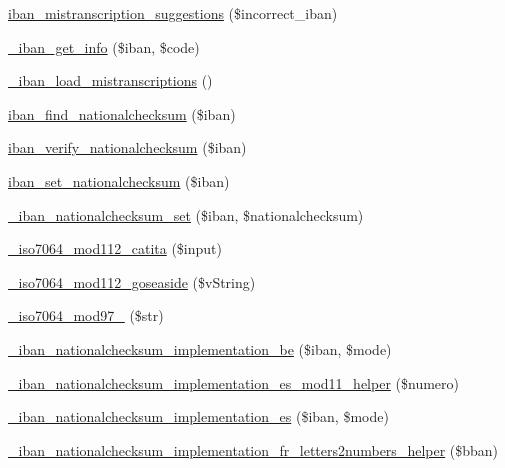 \begin{DoxyCompactItemize}
\hyperlink{classWEPPO_1_1Helpers_1_1IBAN_a33587feb2d62c92fd60b104f3cde0bf9}{iban\+\_\+mistranscription\+\_\+suggestions} (\$incorrect\+\_\+iban)
\item 
\hyperlink{classWEPPO_1_1Helpers_1_1IBAN_addfd1028a5c8f723736bda858edf1b18}{\+\_\+iban\+\_\+get\+\_\+info} (\$iban, \$code)
\item 
\hyperlink{classWEPPO_1_1Helpers_1_1IBAN_abe65378f5932759d6d2d5eddd26e74f0}{\+\_\+iban\+\_\+load\+\_\+mistranscriptions} ()
\item 
\hyperlink{classWEPPO_1_1Helpers_1_1IBAN_a70a116b3763dbd94ea5550ce29e3f72b}{iban\+\_\+find\+\_\+nationalchecksum} (\$iban)
\item 
\hyperlink{classWEPPO_1_1Helpers_1_1IBAN_a55821d4db676112b84dcd5fb16b720f6}{iban\+\_\+verify\+\_\+nationalchecksum} (\$iban)
\item 
\hyperlink{classWEPPO_1_1Helpers_1_1IBAN_a006036ab16fb249833e3e83e0b02d302}{iban\+\_\+set\+\_\+nationalchecksum} (\$iban)
\item 
\hyperlink{classWEPPO_1_1Helpers_1_1IBAN_a7fb2e25d92d76f726ceb39d9dc155692}{\+\_\+iban\+\_\+nationalchecksum\+\_\+set} (\$iban, \$nationalchecksum)
\item 
\hyperlink{classWEPPO_1_1Helpers_1_1IBAN_a36298bcee6bd881050893c4001e67680}{\+\_\+iso7064\+\_\+mod112\+\_\+catita} (\$input)
\item 
\hyperlink{classWEPPO_1_1Helpers_1_1IBAN_ac2019ecd8205765bc592682479a1455e}{\+\_\+iso7064\+\_\+mod112\+\_\+goseaside} (\$v\+String)
\item 
\hyperlink{classWEPPO_1_1Helpers_1_1IBAN_aa348d3fb233092c9f37167e6bfdcc8a7}{\+\_\+iso7064\+\_\+mod97\+\_} (\$str)
\item 
\hyperlink{classWEPPO_1_1Helpers_1_1IBAN_a372144baec6b92d78464f7f829ec3f2a}{\+\_\+iban\+\_\+nationalchecksum\+\_\+implementation\+\_\+be} (\$iban, \$mode)
\item 
\hyperlink{classWEPPO_1_1Helpers_1_1IBAN_ad1f6ee7ba194a34a191f1ffcadacb212}{\+\_\+iban\+\_\+nationalchecksum\+\_\+implementation\+\_\+es\+\_\+mod11\+\_\+helper} (\$numero)
\item 
\hyperlink{classWEPPO_1_1Helpers_1_1IBAN_aa9b0965917856e0bdea1351d3fcf81b0}{\+\_\+iban\+\_\+nationalchecksum\+\_\+implementation\+\_\+es} (\$iban, \$mode)
\item 
\hyperlink{classWEPPO_1_1Helpers_1_1IBAN_a2313da25cbfa80a7c83d8e74834f27e8}{\+\_\+iban\+\_\+nationalchecksum\+\_\+implementation\+\_\+fr\+\_\+letters2numbers\+\_\+helper} (\$bban)
\item 

\end{DoxyCompactItemize}
